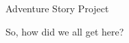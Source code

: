 \documentclass{article}
\begin{document}
\Huge Adventure Story Project

So, how did we all get here?
\end{document}
